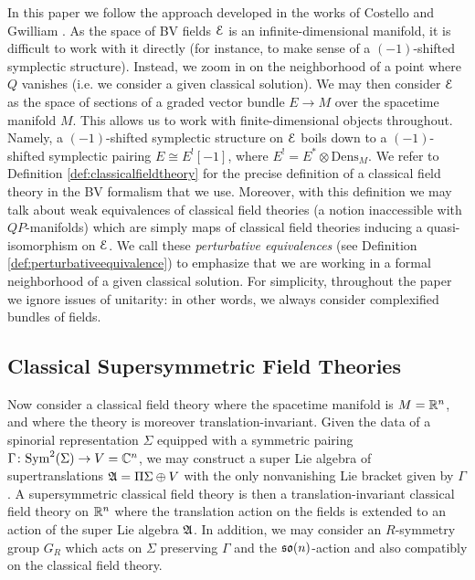 \documentclass[10pt, oneside]{article}
\newcommand{\Dens}{\mathrm{Dens}}
\begin{document}
In this paper we follow the approach developed in the works of Costello and Gwilliam \cite{CostelloBook,Book1}. As the space of BV fields $\mathcal E$ is an infinite-dimensional manifold, it is difficult to work with it directly (for instance, to make sense of a $(-1)$-shifted symplectic structure). Instead, we zoom in on the neighborhood of a point where $Q$ vanishes (i.e. we consider a given classical solution). We may then consider $\mathcal E$ as the space of sections of a graded vector bundle $E\rightarrow M$ over the spacetime manifold $M$. This allows us to work with finite-dimensional objects throughout. Namely, a $(-1)$-shifted symplectic structure on $\mathcal E$ boils down to a $(-1)$-shifted symplectic pairing $E\cong E^![-1]$, where $E^!=E^*\otimes \Dens_M$. We refer to Definition \ref{def:classicalfieldtheory} for the precise definition of a classical field theory in the BV formalism that we use. Moreover, with this definition we may talk about weak equivalences of classical field theories (a notion inaccessible with $QP$-manifolds) which are simply maps of classical field theories inducing a quasi-isomorphism on $\mathcal E$. We call these \emph{perturbative equivalences} (see Definition \ref{def:perturbativeequivalence}) to emphasize that we are working in a formal neighborhood of a given classical solution. For simplicity, throughout the paper we ignore issues of unitarity: in other words, we always consider complexified bundles of fields.

\subsection*{Classical Supersymmetric Field Theories}

Now consider a classical field theory where the spacetime manifold is $M=\mathbb R^n$, and where the theory is moreover translation-invariant. Given the data of a spinorial representation $\Sigma$ equipped with a symmetric pairing $\Gamma\colon{\rm Sym}^2(\Sigma)\rightarrow V=\mathbb C^n$, we may construct a super Lie algebra of supertranslations $\mathfrak A=\Pi\Sigma\oplus V$ with the only nonvanishing Lie bracket given by $\Gamma$. A supersymmetric classical field theory is then a translation-invariant classical field theory on $\mathbb R^n$ where the translation action on the fields is extended to an action of the super Lie algebra $\mathfrak A$. In addition, we may consider an $R$-symmetry group $G_R$ which acts on $\Sigma$ preserving $\Gamma$ and the $\mathfrak{so}(n)$-action and also compatibly on the classical field theory.
\end{document}
